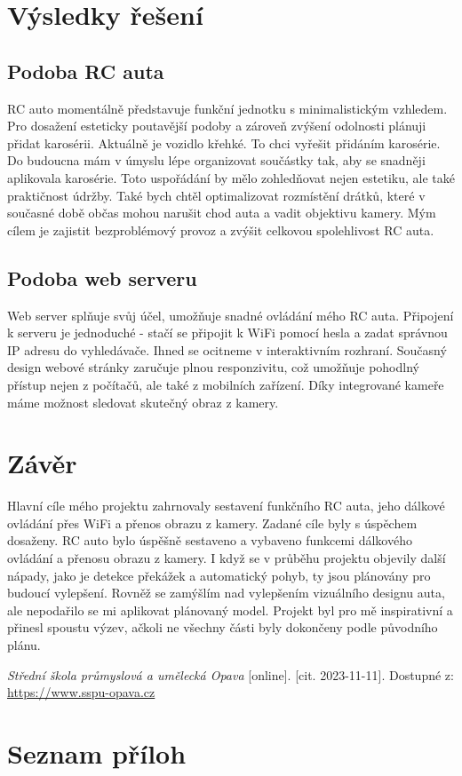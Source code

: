 \documentclass[12pt, a4paper,
oneside,      %
openany
]{report}
\begin{document}
	\chapter{Výsledky řešení}

    \section{Podoba RC auta}
    \noindent RC auto momentálně představuje funkční jednotku s minimalistickým vzhledem. Pro dosažení esteticky poutavější podoby a zároveň zvýšení odolnosti plánuji přidat karosérii. Aktuálně je vozidlo křehké. To chci vyřešit přidáním karosérie. Do budoucna mám v úmyslu lépe organizovat součástky tak, aby se snadněji aplikovala karosérie. Toto uspořádání by mělo zohledňovat nejen estetiku, ale také praktičnost údržby. Také bych chtěl optimalizovat rozmístění drátků, které v současné době občas mohou narušit chod auta a vadit objektivu kamery. Mým cílem je zajistit bezproblémový provoz a zvýšit celkovou spolehlivost RC auta.
    
    \section{Podoba web serveru}

    \noindent Web server splňuje svůj účel, umožňuje snadné ovládání mého RC auta. Připojení k serveru je jednoduché - stačí se připojit k WiFi pomocí hesla a zadat správnou IP adresu do vyhledávače. Ihned se ocitneme v interaktivním rozhraní. Současný design webové stránky zaručuje plnou responzivitu, což umožňuje pohodlný přístup nejen z počítačů, ale také z mobilních zařízení. Díky integrované kameře máme možnost sledovat skutečný obraz z kamery.
 
	\chapter*{Závěr}
	\noindent Hlavní cíle mého projektu zahrnovaly sestavení funkčního RC auta, jeho dálkové ovládání přes WiFi a přenos obrazu z kamery. Zadané cíle byly s úspěchem dosaženy. RC auto bylo úspěšně sestaveno a vybaveno funkcemi dálkového ovládání a přenosu obrazu z kamery. I když se v průběhu projektu objevily další nápady, jako je detekce překážek a automatický pohyb, ty jsou plánovány pro budoucí vylepšení. Rovněž se zamýšlím nad vylepšením vizuálního designu auta, ale nepodařilo se mi aplikovat plánovaný model. Projekt byl pro mě inspirativní a přinesl spoustu výzev, ačkoli ne všechny části byly dokončeny podle původního plánu.
	
	\begin{thebibliography}{99}
		 \textit{Střední škola průmyslová a umělecká Opava} [online]. [cit. 2023-11-11]. Dostupné z: \url{https://www.sspu-opava.cz}
	\end{thebibliography}
	
	\chapter*{Seznam příloh}
	
\end{document}

